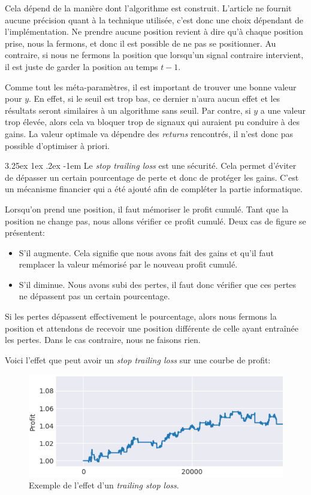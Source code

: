 \documentclass[a4paper, 11pt]{article}
\makeatletter
\renewcommand\paragraph{\@startsection{paragraph}{5}{\z@}%
  {3.25ex \@plus1ex \@minus.2ex}%
  {-1em}%
  {\normalfont\normalsize\bfseries}}
\makeatother
\begin{document}
Cela dépend de la manière dont l'algorithme est construit. L'article ne fournit aucune précision quant à la technique utilisée, c'est donc une choix
dépendant de l'implémentation. Ne prendre aucune position revient à dire qu'à chaque position prise, nous la fermons, et donc il est possible de ne pas
se positionner. Au contraire, si nous ne fermons la position que lorsqu'un signal contraire intervient, il est juste de garder la position au temps $t-1$.

Comme tout les méta-paramètres, il est important de trouver une bonne valeur pour $y$. En effet, si le seuil est trop bas, ce dernier n'aura aucun effet 
et les résultats seront similaires à un algorithme sans seuil. Par contre, si $y$ a une valeur trop élevée, alors cela va bloquer trop de signaux qui
auraient pu conduire à des gains. La valeur optimale va dépendre des \textit{returns} rencontrés, il n'est donc pas possible d'optimiser à priori.

\paragraph{}
Le \textit{stop trailing loss} est une sécurité. Cela permet d'éviter de dépasser un certain pourcentage de perte et donc de protéger les gains. C'est un
mécanisme financier qui a été ajouté afin de compléter la partie informatique.

Lorsqu'on prend une position, il faut mémoriser le profit cumulé. Tant que la position ne change pas, nous allons vérifier ce profit cumulé. Deux cas de
figure se présentent:
\begin{itemize}
 \item S'il augmente. Cela signifie que nous avons fait des gains et qu'il faut remplacer la valeur mémorisé par le nouveau profit cumulé.
 \item S'il diminue. Nous avons subi des pertes, il faut donc vérifier que ces pertes ne dépassent pas un certain pourcentage.
\end{itemize}

Si les pertes dépassent effectivement le pourcentage, alors nous fermons la position et attendons de recevoir une position différente de celle ayant
entraînée les pertes. Dans le cas contraire, nous ne faisons rien.

Voici l'effet que peut avoir un \textit{stop trailing loss} sur une courbe de profit:
\begin{figure}[H]
\centering
\includegraphics[scale=0.5]{images/stop_loss}
\caption{Exemple de l'effet d'un \textit{trailing stop loss}.}
\end{figure}
\end{document}
